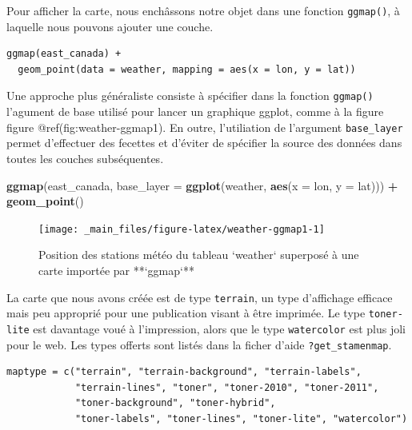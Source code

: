 \documentclass[]{book}
\newenvironment{Shaded}{\begin{snugshade}}{\end{snugshade}}
\newcommand{\DataTypeTok}[1]{\textcolor[rgb]{0.13,0.29,0.53}{#1}}
\newcommand{\KeywordTok}[1]{\textcolor[rgb]{0.13,0.29,0.53}{\textbf{#1}}}
\newcommand{\NormalTok}[1]{#1}
\newcommand{\OperatorTok}[1]{\textcolor[rgb]{0.81,0.36,0.00}{\textbf{#1}}}
\newcommand{\StringTok}[1]{\textcolor[rgb]{0.31,0.60,0.02}{#1}}
\begin{document}
Pour afficher la carte, nous enchâssons notre objet dans une fonction
\texttt{ggmap()}, à laquelle nous pouvons ajouter une couche.

\begin{verbatim}
ggmap(east_canada) + 
  geom_point(data = weather, mapping = aes(x = lon, y = lat))
\end{verbatim}

Une approche plus généraliste consiste à spécifier dans la fonction
\texttt{ggmap()} l'agument de base utilisé pour lancer un graphique
ggplot, comme à la figure figure @ref(fig:weather-ggmap1). En outre,
l'utiliation de l'argument \texttt{base\_layer} permet d'effectuer des
fecettes et d'éviter de spécifier la source des données dans toutes les
couches subséquentes.

\begin{Shaded}
\begin{Highlighting}[]
\KeywordTok{ggmap}\NormalTok{(east_canada,}
      \DataTypeTok{base_layer =} \KeywordTok{ggplot}\NormalTok{(weather, }\KeywordTok{aes}\NormalTok{(}\DataTypeTok{x =}\NormalTok{ lon, }\DataTypeTok{y =}\NormalTok{ lat))) }\OperatorTok{+}\StringTok{ }
\StringTok{  }\KeywordTok{geom_point}\NormalTok{()}
\end{Highlighting}
\end{Shaded}

\begin{figure}

{\centering \texttt{[image: \_main\_files/figure-latex/weather-ggmap1-1]} 

}

\caption{Position des stations météo du tableau `weather` superposé à une carte importée par **`ggmap`**}\label{fig:weather-ggmap1}
\end{figure}

La carte que nous avons créée est de type \texttt{terrain}, un type
d'affichage efficace mais peu approprié pour une publication visant à
être imprimée. Le type \texttt{toner-lite} est davantage voué à
l'impression, alors que le type \texttt{watercolor} est plus joli pour
le web. Les types offerts sont listés dans la ficher d'aide
\texttt{?get\_stamenmap}.

\begin{verbatim}
maptype = c("terrain", "terrain-background", "terrain-labels",
            "terrain-lines", "toner", "toner-2010", "toner-2011",
            "toner-background", "toner-hybrid",
            "toner-labels", "toner-lines", "toner-lite", "watercolor")
\end{verbatim}
\end{document}
